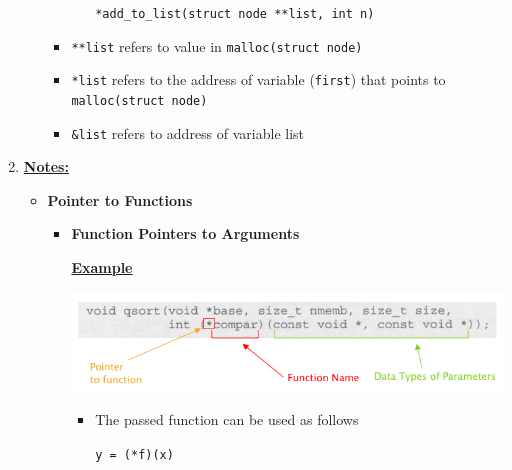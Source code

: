 \documentclass[12pt]{article}
\begin{document}
\begin{enumerate}[1.]
\begin{itemize}
\begin{itemize}
\begin{itemize}
                \bigskip

                \texttt{*add\_to\_list(struct node **list, int n)}
            \end{itemize}

            \item \texttt{**list} refers to value in \texttt{malloc(struct node)}
            \item \texttt{*list} refers to the address of variable (\texttt{first}) that points to \texttt{malloc(struct node)}
            \item \texttt{\&list} refers to address of variable list
        \end{itemize}
    \end{itemize}

    \item

    \bigskip

    \underline{\textbf{Notes:}}

    \begin{itemize}
        \item \textbf{Pointer to Functions}

        \begin{itemize}
            \item \textbf{Function Pointers to Arguments}

            \bigskip

            \underline{\textbf{Example}}

            \bigskip

            \begin{center}
            \includegraphics[width=\linewidth]{images/review_8_solution_9.png}
            \end{center}

            \begin{itemize}
                \item The passed function can be used as follows

                \bigskip

                \texttt{y = (*f)(x)}
            \end{itemize}

        \end{itemize}
    \end{itemize}

\end{enumerate}
\end{document}
